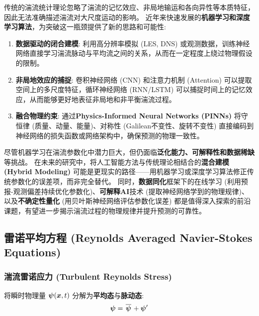 \begin{insightbox}[基于人工智能的湍流参数化方案]
    传统的湍流统计理论忽略了湍流的记忆效应、非局地输运和各向异性等本质特征，因此无法准确描述湍流对大尺度运动的影响。
    近年来快速发展的\textbf{机器学习和深度学习算法}，为突破这一瓶颈提供了新的思路和可能性:
    \begin{enumerate}
        \item \textbf{数据驱动的闭合建模}: 利用高分辨率模拟 (LES, DNS) 或观测数据，训练神经网络直接学习湍流脉动与平均流之间的关系，从而在一定程度上绕过物理假设的限制。
        \item \textbf{非局地效应的捕捉}: 卷积神经网络 (CNN) 和注意力机制 (Attention) 可以提取空间上的多尺度特征，循环神经网络 (RNN/LSTM) 可以捕捉时间上的记忆效应，从而能够更好地表征非局地和非平衡湍流过程。
        \item \textbf{融合物理约束}: 通过\textbf{Physics-Informed Neural Networks (PINNs)} 将守恒律 (质量、动量、能量)、对称性 (Galilean不变性、旋转不变性) 直接编码到神经网络的损失函数或网络架构中，确保预测的物理一致性。
    \end{enumerate}

    尽管机器学习在湍流参数化中潜力巨大，但仍面临\textbf{泛化能力、可解释性和数据稀缺}等挑战。
    在未来的研究中，将人工智能方法与传统理论相结合的\textbf{混合建模 (Hybrid Modeling)} 可能是更现实的路径——用机器学习或深度学习算法修正传统参数化的误差项，而非完全替代。
    同时，\textbf{数据同化}框架下的在线学习 (利用预报-观测偏差持续优化参数化)、\textbf{可解释AI}技术 (提取神经网络学到的物理规律)、以及\textbf{不确定性量化} (用贝叶斯神经网络评估参数化误差) 都是值得深入探索的前沿课题，有望进一步揭示湍流过程的物理规律并提升预测的可靠性。
\end{insightbox}

\subsection{雷诺平均方程 (Reynolds Averaged Navier-Stokes Equations)}

\subsubsection{湍流雷诺应力 (Turbulent Reynolds Stress)}

将瞬时物理量 $\bm{\psi}(\bm{x}, t)$ 分解为\textbf{平均态}与\textbf{脉动态}:
\begin{equation}
    \bm{\psi} = \mkern2mu \overline{\bm{\psi}} \mkern2mu + \bm{\psi}'
    \label{eq:reynolds_decomposition}
\end{equation}

